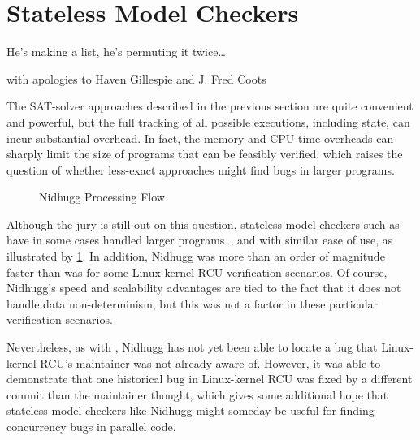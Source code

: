 
\section{Stateless Model Checkers}
\label{sec:formal:Stateless Model Checkers}
%
\epigraph{He's making a list, he's permuting it twice\dots}
	{with apologies to Haven Gillespie and J. Fred Coots}

The SAT-solver approaches described in the previous section are quite
convenient and powerful, but the full tracking of all possible
executions, including state, can incur substantial overhead.
In fact, the memory and CPU-time overheads can sharply limit the size
of programs that can be feasibly verified, which raises the question
of whether less-exact approaches might find bugs in larger programs.

\begin{figure}
\centering
{}
\caption{Nidhugg Processing Flow}
\label{fig:formal:Nidhugg Processing Flow}
\end{figure}

Although the jury is still out on this question, stateless model
checkers such as ~\cite{CarlLeonardsson2014Nidhugg} have in
some cases handled larger programs~\cite{SMC-TreeRCU}, and with
similar ease of use, as illustrated by
\cref{fig:formal:Nidhugg Processing Flow}.
In addition, Nidhugg was more than an order of magnitude faster than
was  for some Linux-kernel RCU verification scenarios.
Of course, Nidhugg's speed and scalability advantages are tied to
the fact that it does not handle data non-determinism, but this
was not a factor in these particular verification scenarios.

Nevertheless, as with , Nidhugg has not yet been able to
locate a bug that Linux-kernel RCU's maintainer was not already
aware of.
However, it was able to demonstrate that one historical bug in
Linux-kernel RCU was fixed by a different commit than the maintainer
thought, which gives some additional hope that stateless model checkers
like Nidhugg might someday be useful for finding concurrency bugs in
parallel code.
